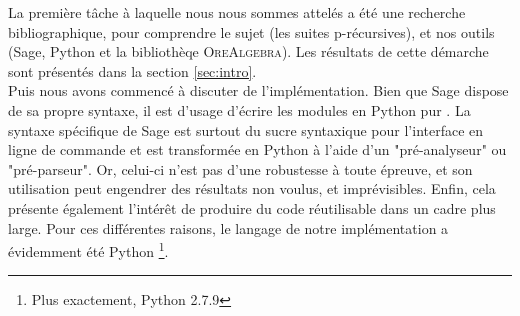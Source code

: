 \documentclass[12pt]{article}
\begin{document}
    \par La première tâche à laquelle nous nous sommes attelés a été une recherche
    bibliographique,
    pour comprendre le sujet (les suites p-récursives), et nos outils (Sage, Python et la 
    bibliothèqe \textsc{OreAlgebra}).
    Les résultats de cette démarche sont présentés dans la section \ref{sec:intro}.\\
    Puis nous avons commencé à discuter de l'implémentation. Bien que Sage dispose de sa propre
    syntaxe, il est d'usage d'écrire les modules en \og Python pur \fg. La syntaxe spécifique
    de Sage est surtout du sucre syntaxique pour l'interface en ligne de
    commande et est transformée en Python à l'aide d'un "pré-analyseur" ou "pré-parseur".
    Or, celui-ci n'est pas d'une robustesse à toute épreuve,
    et son utilisation peut engendrer des résultats non voulus, et imprévisibles. Enfin, 
    cela présente également l'intérêt de produire du code réutilisable dans un cadre plus large.
    Pour ces différentes raisons, le langage de notre implémentation a évidemment été Python
    \footnote{Plus exactement, Python 2.7.9}.
\end{document}
